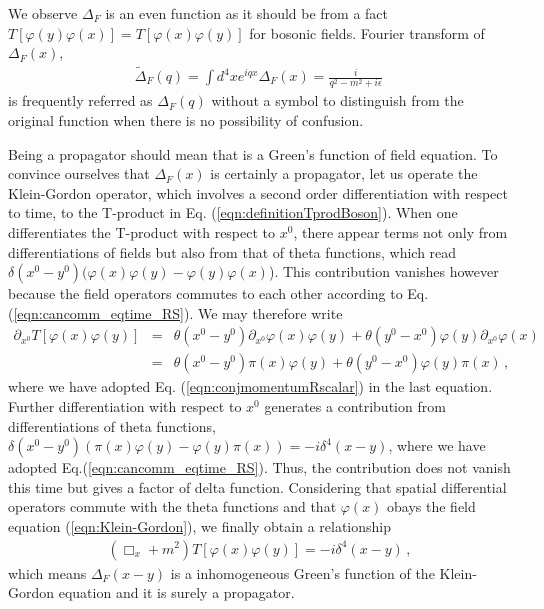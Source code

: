 We observe $\Delta_F$ is an even function
as it should be from a fact $T[\varphi(y)\varphi(x)] = T[\varphi(x)\varphi(y)]$
for bosonic fields.
Fourier transform of $\Delta_F(x)$,
\begin{eqnarray}
\tilde{\Delta}_F(q) 
=
\int d^4x e^{iqx} \Delta_F(x)
=
\frac{i}{q^2 - m^2 + i\epsilon}\,
\end{eqnarray}
is frequently referred as $\Delta_F(q)$ without a symbol to distinguish
from the original function
when there is no possibility of confusion. 

Being a propagator should mean that is a Green's function of 
field equation. To convince ourselves that $\Delta_F(x)$ is certainly a propagator,
let us operate the Klein-Gordon operator,
which involves a second order differentiation with respect to time,
 to the T-product in Eq. (\ref{eqn:definitionTprodBoson}).
When one differentiates the T-product with respect to $x^0$, there appear terms 
not only from differentiations of fields but also from that of theta functions, which read
$\delta(x^0 - y^0)(\varphi(x)\varphi(y) - \varphi(y)\varphi(x)$).
This contribution vanishes however because the field operators commutes to each other
according to Eq. (\ref{eqn:cancomm_eqtime_RS}).
We may therefore write
\begin{eqnarray}
\partial_{x^0} T[\varphi(x) \varphi(y)]
&=&
\theta(x^0 - y^0)\partial_{x^0} \varphi(x) \varphi(y)
+
\theta(y^0 - x^0)\varphi(y) \partial_{x^0} \varphi(x)
\nonumber\\
&=&
\theta(x^0 - y^0) \pi(x) \varphi(y)
+
\theta(y^0 - x^0)\varphi(y) \pi(x)\,,
\nonumber
\end{eqnarray}
where we have adopted Eq. (\ref{eqn:conjmomentumRscalar}) in the  last equation.
Further differentiation with respect to $x^0$ generates a contribution from
differentiations of theta functions, 
$\delta(x^0 - y^0)(\pi(x)\varphi(y) - \varphi(y)\pi(x)) = - i \delta^4(x -y)$,
where we have adopted Eq.(\ref{eqn:cancomm_eqtime_RS}).
Thus, the contribution does not vanish this time but gives
a factor of delta function.
Considering that 
spatial differential operators 
commute with the theta functions and 
that $\varphi(x)$ obays the field equation (\ref{eqn:Klein-Gordon}), 
we finally obtain a relationship
\begin{eqnarray}
\left( \Box_x + m^2 \right) T[\varphi(x) \varphi(y)]
=
-i \delta^4(x - y)\,,
\end{eqnarray}
which means $\Delta_F(x-y)$ is a inhomogeneous Green's function
of the Klein-Gordon equation and it is surely a propagator.





